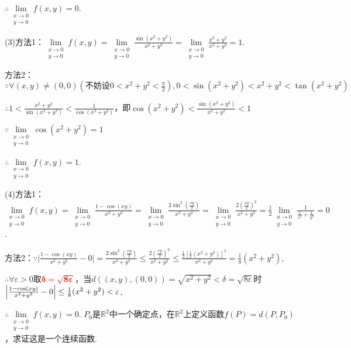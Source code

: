\documentclass[12pt,UTF8]{ctexart}
\begin{document}
\begin{enumerate}
$\therefore\lim\limits_{\substack{x\rightarrow0\\ y\rightarrow0}}f(x,y)=0$.

(3)方法1：$\lim\limits_{\substack{x\rightarrow0\\ y\rightarrow0}}f(x,y)=\lim\limits_{\substack{x\rightarrow0\\ y\rightarrow0}}\frac{\sin(x^2+y^2)}{x^2+y^2}=\lim\limits_{\substack{x\rightarrow0\\ y\rightarrow0}}\frac{x^2+y^2}{x^2+y^2}=1$.

方法2：$\because\forall(x,y)\neq(0,0)(\text{不妨设$0<x^2+y^2<\frac\pi2$}),0<\sin(x^2+y^2)<x^2+y^2<\tan(x^2+y^2)$

$\therefore1<\frac{x^2+y^2}{\sin(x^2+y^2)}<\frac1{\cos(x^2+y^2)}$，即$\cos(x^2+y^2)<\frac{\sin(x^2+y^2)}{x^2+y^2}<1$

$\because\lim\limits_{\substack{x\rightarrow0\\ y\rightarrow0}}\cos(x^2+y^2)=1$

$\therefore\lim\limits_{\substack{x\rightarrow0\\ y\rightarrow0}}f(x,y)=1$.

(4)方法1：$\lim\limits_{\substack{x\rightarrow0\\ y\rightarrow0}}f(x,y)=\lim\limits_{\substack{x\rightarrow0\\ y\rightarrow0}}\frac{1-\cos(xy)}{x^2+y^2}=\lim\limits_{\substack{x\rightarrow0\\ y\rightarrow0}}\frac{2\sin^2(\frac{xy}2)}{x^2+y^2}=\lim\limits_{\substack{x\rightarrow0\\ y\rightarrow0}}\frac{2(\frac{xy}2)^2}{x^2+y^2}=\frac12\lim\limits_{\substack{x\rightarrow0\\ y\rightarrow0}}\frac1{\frac1{x^2}+\frac1{y^2}}=0$.

方法2：$\because\Big|\frac{1-\cos(xy)}{x^2+y^2}-0\Big|=\frac{2\sin^2(\frac{xy}2)}{x^2+y^2}\leq\frac{2(\frac{xy}2)^2}{x^2+y^2}\leq\frac{\frac12[\frac12(x^2+y^2)]^2}{x^2+y^2}=\frac18(x^2+y^2)$,

$\therefore\forall\varepsilon>0$取\textcolor{red}{$\bm{\delta=\sqrt{8\varepsilon}}$}\footnotemark{}，当$d((x,y),(0,0))=\sqrt{x^2+y^2}<\delta=\sqrt{8\varepsilon}$时$\Big|\frac{1-\cos(xy)}{x^2+y^2}-0\Big|\\
\leq\frac18(x^2+y^2)<\varepsilon$,

$\therefore\lim\limits_{\substack{x\rightarrow0\\ y\rightarrow0}}f(x,y)=0$.
$P_0$是$\mathbb R^2$中一个确定点，在$\mathbb R^2$上定义函数$f(P)=d(P,P_0)$，求证这是一个连续函数.


\end{enumerate}
\end{document}
